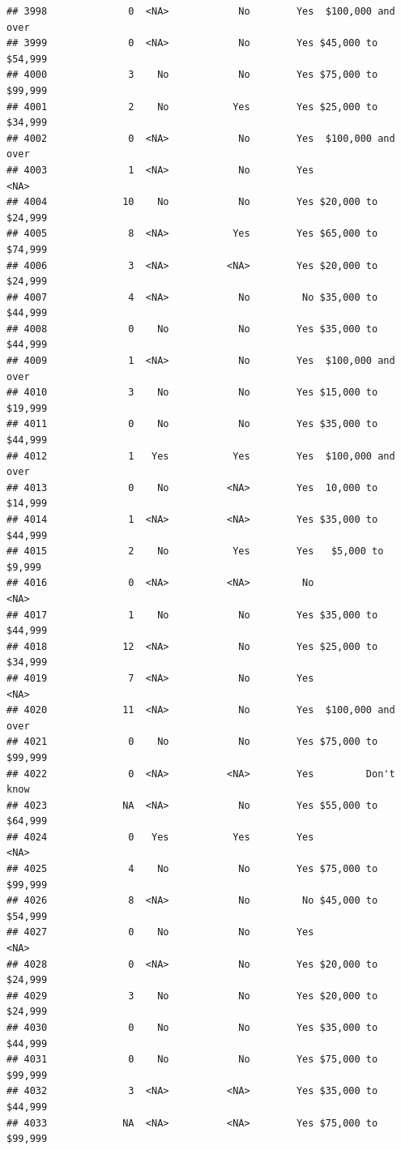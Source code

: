 \documentclass[man]{apa6}
\begin{document}
\begin{verbatim}
## 3998              0  <NA>            No        Yes  $100,000 and over
## 3999              0  <NA>            No        Yes $45,000 to $54,999
## 4000              3    No            No        Yes $75,000 to $99,999
## 4001              2    No           Yes        Yes $25,000 to $34,999
## 4002              0  <NA>            No        Yes  $100,000 and over
## 4003              1  <NA>            No        Yes               <NA>
## 4004             10    No            No        Yes $20,000 to $24,999
## 4005              8  <NA>           Yes        Yes $65,000 to $74,999
## 4006              3  <NA>          <NA>        Yes $20,000 to $24,999
## 4007              4  <NA>            No         No $35,000 to $44,999
## 4008              0    No            No        Yes $35,000 to $44,999
## 4009              1  <NA>            No        Yes  $100,000 and over
## 4010              3    No            No        Yes $15,000 to $19,999
## 4011              0    No            No        Yes $35,000 to $44,999
## 4012              1   Yes           Yes        Yes  $100,000 and over
## 4013              0    No          <NA>        Yes  10,000 to $14,999
## 4014              1  <NA>          <NA>        Yes $35,000 to $44,999
## 4015              2    No           Yes        Yes   $5,000 to $9,999
## 4016              0  <NA>          <NA>         No               <NA>
## 4017              1    No            No        Yes $35,000 to $44,999
## 4018             12  <NA>            No        Yes $25,000 to $34,999
## 4019              7  <NA>            No        Yes               <NA>
## 4020             11  <NA>            No        Yes  $100,000 and over
## 4021              0    No            No        Yes $75,000 to $99,999
## 4022              0  <NA>          <NA>        Yes         Don't know
## 4023             NA  <NA>            No        Yes $55,000 to $64,999
## 4024              0   Yes           Yes        Yes               <NA>
## 4025              4    No            No        Yes $75,000 to $99,999
## 4026              8  <NA>            No         No $45,000 to $54,999
## 4027              0    No            No        Yes               <NA>
## 4028              0  <NA>            No        Yes $20,000 to $24,999
## 4029              3    No            No        Yes $20,000 to $24,999
## 4030              0    No            No        Yes $35,000 to $44,999
## 4031              0    No            No        Yes $75,000 to $99,999
## 4032              3  <NA>          <NA>        Yes $35,000 to $44,999
## 4033             NA  <NA>          <NA>        Yes $75,000 to $99,999

\end{verbatim}
\end{document}
